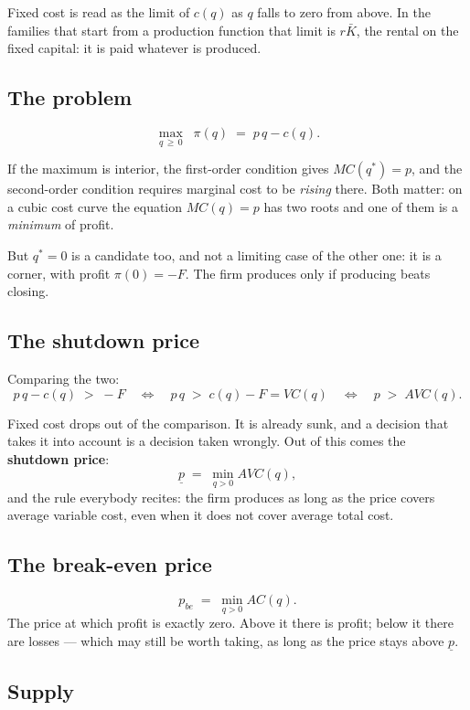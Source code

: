 \documentclass[11pt,a4paper]{appletmanual}
\begin{document}
Fixed cost is read as the limit of $c(q)$ as $q$ falls to zero from above. In
the families that start from a production function that limit is $r\bar K$, the
rental on the fixed capital: it is paid whatever is produced.

\subsection{The problem}

\[
  \max_{q \,\ge\, 0} \;\; \pi(q) \;=\; p\,q - c(q).
\]

If the maximum is interior, the first-order condition gives
$MC(q^\ast) = p$, and the second-order condition requires marginal cost to be
\emph{rising} there. Both matter: on a cubic cost curve the equation
$MC(q) = p$ has two roots and one of them is a \emph{minimum} of profit.

But $q^\ast = 0$ is a candidate too, and not a limiting case of the other one:
it is a corner, with profit $\pi(0) = -F$. The firm produces only if producing
beats closing.

\subsection{The shutdown price}

Comparing the two:
\[
  p\,q - c(q) \;>\; -F
  \quad\Longleftrightarrow\quad
  p\,q \;>\; c(q) - F = VC(q)
  \quad\Longleftrightarrow\quad
  p \;>\; AVC(q).
\]

Fixed cost drops out of the comparison. It is already sunk, and a decision that
takes it into account is a decision taken wrongly. Out of this comes the
\textbf{shutdown price}:
\[
  \underline{p} \;=\; \min_{q > 0} AVC(q),
\]
and the rule everybody recites: the firm produces as long as the price covers
average variable cost, even when it does not cover average total cost.

\subsection{The break-even price}

\[
  p_{be} \;=\; \min_{q>0} AC(q).
\]
The price at which profit is exactly zero. Above it there is profit; below it
there are losses --- which may still be worth taking, as long as the price
stays above $\underline{p}$.

\subsection{Supply}
\end{document}
